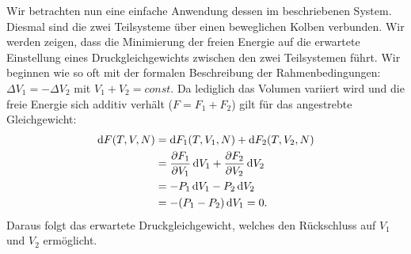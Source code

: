 Wir betrachten nun eine einfache Anwendung dessen im beschriebenen System. Diesmal sind die zwei Teilsysteme über einen beweglichen Kolben verbunden. Wir werden zeigen, dass die Minimierung der freien Energie auf die erwartete Einstellung eines Druckgleichgewichts zwischen den zwei Teilsystemen führt. Wir beginnen wie so oft mit der formalen Beschreibung der Rahmenbedingungen: $\Delta V_1=-\Delta V_2$ mit $V_1+V_2=const$. Da lediglich das Volumen variiert wird und die freie Energie sich additiv verhält ($F=F_1+F_2$) gilt für das angestrebte Gleichgewicht: 
\begin{align*}
    \diff F(T,V,N)&=\diff F_1(T,V_1,N)+\diff F_2(T,V_2,N)\\
    &=\frac{\partial F_1}{\partial V_1}\diff V_1+\frac{\partial F_2}{\partial V_2}\diff V_2\\
    &=-P_1\diff V_1-P_2\diff V_2\\
    &=-(P_1-P_2)\diff V_1=0.
\end{align*}
Daraus folgt das erwartete Druckgleichgewicht, welches den Rückschluss auf $V_1$ und $V_2$ ermöglicht.
